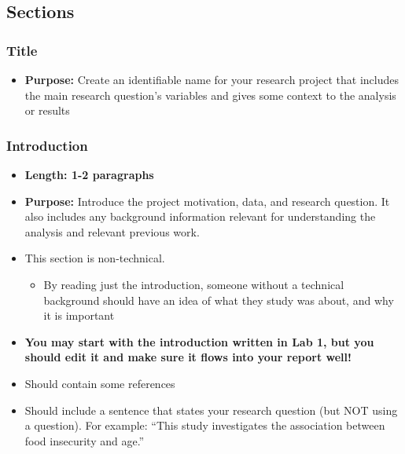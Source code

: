 \documentclass[
  letterpaper,
  DIV=11,
  numbers=noendperiod]{scrartcl}
\providecommand{\tightlist}{%
  \setlength{\itemsep}{0pt}\setlength{\parskip}{0pt}}\usepackage{longtable,booktabs,array}
\begin{document}
\hypertarget{sections}{%
\subsection{Sections}\label{sections}}

\hypertarget{title}{%
\subsubsection{Title}\label{title}}

\begin{itemize}
\tightlist
\item
  \textbf{Purpose:} Create an identifiable name for your research
  project that includes the main research question's variables and gives
  some context to the analysis or results
\end{itemize}

\hypertarget{introduction}{%
\subsubsection{Introduction}\label{introduction}}

\begin{itemize}
\tightlist
\item
  \textbf{Length: 1-2 paragraphs}
\item
  \textbf{Purpose:} Introduce the project motivation, data, and research
  question. It also includes any background information relevant for
  understanding the analysis and relevant previous work.
\item
  This section is non-technical.

  \begin{itemize}
  \tightlist
  \item
    By reading just the introduction, someone without a technical
    background should have an idea of what they study was about, and why
    it is important
  \end{itemize}
\item
  {\textbf{You may start with the introduction written in Lab 1, but you
  should edit it and make sure it flows into your report well!}}
\item
  Should contain some references
\item
  Should include a sentence that states your research question (but NOT
  using a question). For example: ``This study investigates the
  association between food insecurity and age.''
\end{itemize}
\end{document}
